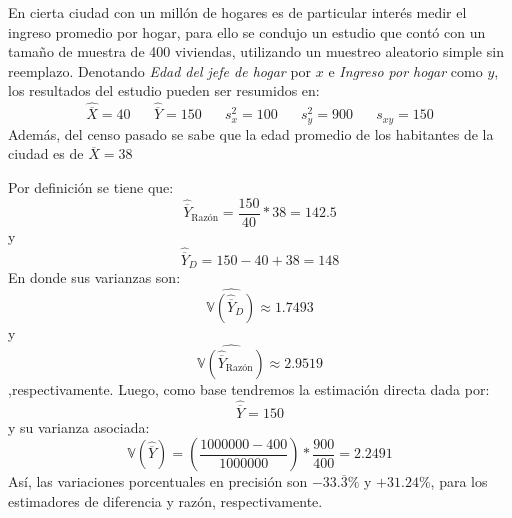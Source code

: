 
\addpoints

\question[20] En cierta ciudad con un millón de hogares es de particular interés medir el ingreso promedio por hogar, para ello se condujo un estudio que contó con un tamaño de muestra de 400 viviendas, utilizando un muestreo aleatorio simple sin reemplazo. Denotando \textit{Edad del jefe de hogar} por $x$ e \textit{Ingreso por hogar} como $y$, los resultados del estudio pueden ser resumidos en:
$$\hat{\overline{X}}=40 \hspace{20pt} \hat{\overline{Y}}=150 \hspace{20pt} s_{x}^{2}=100  \hspace{20pt} s_{y}^{2}=900  \hspace{20pt} s_{xy}=150$$
Además, del censo pasado se sabe que la edad promedio de los habitantes de la ciudad es de $\overline{X}=38$

\noaddpoints


\begin{solution}
Por definición se tiene que:
$$\hat{\overline{Y}}_{\text{Razón}}=\dfrac{150}{40}*38=142.5$$
y
$$\hat{\overline{Y}}_{D}=150-40+38=148$$
En donde sus varianzas son:
$$\widehat{\mathbb{V}(\hat{\overline{Y}}_{D})}\approx 1.7493$$
y
$$\widehat{\mathbb{V}(\hat{\overline{Y}}_{\text{Razón}})}\approx 2.9519$$
,respectivamente. Luego, como base tendremos la estimación directa dada por:
$$\hat{\overline{Y}}=150$$
y su varianza asociada:
$$\mathbb{V}(\hat{\overline{Y}})=\left(\dfrac{1000000-400}{1000000}\right)*\dfrac{900}{400}=2.2491$$
Así, las variaciones porcentuales en precisión son $-33.\overline{3}\%$ y $+31.24\%$, para los estimadores de diferencia y razón, respectivamente.

\end{solution}